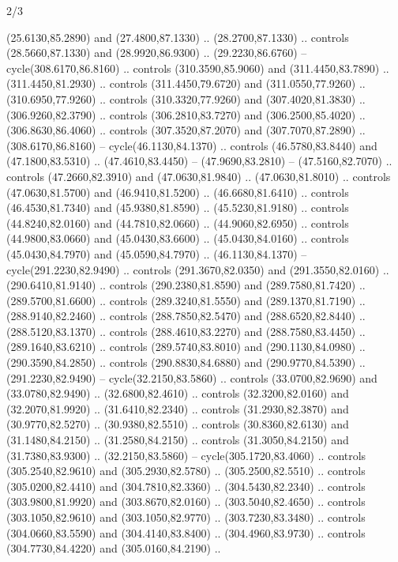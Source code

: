 \begin{flagdescription}{2/3}
\begin{scope}[xshift=0.5\flaglength,yshift=0.5\flagwidth,scale=\stretchfactor]
\begin{scope}[scale=0.001645\flagwidth,yshift=65mm,xshift=-63mm]
\begin{scope}[y=0.80pt, x=0.80pt, yscale=-1,]
\begin{scope}[cm={{1.33333,0.0,0.0,1.33333,(0.0,1e-05)}}]
  (25.6130,85.2890) and (27.4800,87.1330) .. (28.2700,87.1330) .. controls
  (28.5660,87.1330) and (28.9920,86.9300) .. (29.2230,86.6760) --
  cycle(308.6170,86.8160) .. controls (310.3590,85.9060) and (311.4450,83.7890)
  .. (311.4450,81.2930) .. controls (311.4450,79.6720) and (311.0550,77.9260) ..
  (310.6950,77.9260) .. controls (310.3320,77.9260) and (307.4020,81.3830) ..
  (306.9260,82.3790) .. controls (306.2810,83.7270) and (306.2500,85.4020) ..
  (306.8630,86.4060) .. controls (307.3520,87.2070) and (307.7070,87.2890) ..
  (308.6170,86.8160) -- cycle(46.1130,84.1370) .. controls (46.5780,83.8440) and
  (47.1800,83.5310) .. (47.4610,83.4450) -- (47.9690,83.2810) --
  (47.5160,82.7070) .. controls (47.2660,82.3910) and (47.0630,81.9840) ..
  (47.0630,81.8010) .. controls (47.0630,81.5700) and (46.9410,81.5200) ..
  (46.6680,81.6410) .. controls (46.4530,81.7340) and (45.9380,81.8590) ..
  (45.5230,81.9180) .. controls (44.8240,82.0160) and (44.7810,82.0660) ..
  (44.9060,82.6950) .. controls (44.9800,83.0660) and (45.0430,83.6600) ..
  (45.0430,84.0160) .. controls (45.0430,84.7970) and (45.0590,84.7970) ..
  (46.1130,84.1370) -- cycle(291.2230,82.9490) .. controls (291.3670,82.0350)
  and (291.3550,82.0160) .. (290.6410,81.9140) .. controls (290.2380,81.8590)
  and (289.7580,81.7420) .. (289.5700,81.6600) .. controls (289.3240,81.5550)
  and (289.1370,81.7190) .. (288.9140,82.2460) .. controls (288.7850,82.5470)
  and (288.6520,82.8440) .. (288.5120,83.1370) .. controls (288.4610,83.2270)
  and (288.7580,83.4450) .. (289.1640,83.6210) .. controls (289.5740,83.8010)
  and (290.1130,84.0980) .. (290.3590,84.2850) .. controls (290.8830,84.6880)
  and (290.9770,84.5390) .. (291.2230,82.9490) -- cycle(32.2150,83.5860) ..
  controls (33.0700,82.9690) and (33.0780,82.9490) .. (32.6800,82.4610) ..
  controls (32.3200,82.0160) and (32.2070,81.9920) .. (31.6410,82.2340) ..
  controls (31.2930,82.3870) and (30.9770,82.5270) .. (30.9380,82.5510) ..
  controls (30.8360,82.6130) and (31.1480,84.2150) .. (31.2580,84.2150) ..
  controls (31.3050,84.2150) and (31.7380,83.9300) .. (32.2150,83.5860) --
  cycle(305.1720,83.4060) .. controls (305.2540,82.9610) and (305.2930,82.5780)
  .. (305.2500,82.5510) .. controls (305.0200,82.4410) and (304.7810,82.3360) ..
  (304.5430,82.2340) .. controls (303.9800,81.9920) and (303.8670,82.0160) ..
  (303.5040,82.4650) .. controls (303.1050,82.9610) and (303.1050,82.9770) ..
  (303.7230,83.3480) .. controls (304.0660,83.5590) and (304.4140,83.8400) ..
  (304.4960,83.9730) .. controls (304.7730,84.4220) and (305.0160,84.2190) ..

\end{scope}
\end{scope}
\end{scope}
\end{scope}
\end{flagdescription}
